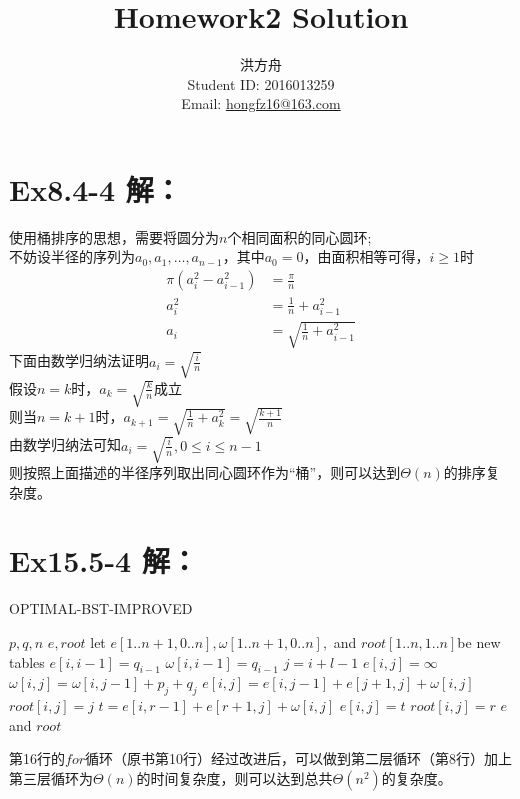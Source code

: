 \documentclass[12pt]{article}
\title{Homework2 Solution}
\author{洪方舟\\Student ID: 2016013259\\Email: \href{mailto:hongfz16@163.com}{hongfz16@163.com}}
\begin{document}
  \maketitle
  \section*{Ex8.4-4 \textbf{解：}}
  	使用桶排序的思想，需要将圆分为$n$个相同面积的同心圆环;\\
  	不妨设半径的序列为$a_0,a_1,\ldots,a_{n-1}$，其中$a_0=0$，由面积相等可得，$i\geq1$时
  	\begin{align*}
  	  \pi(a_i^2-a_{i-1}^2) &= \frac{\pi}{n}\\
  	  a_i^2 &= \frac{1}{n}+a_{i-1}^2\\
  	  a_i &= \sqrt{\frac{1}{n}+a_{i-1}^2}
  	\end{align*}
  	下面由数学归纳法证明$a_i=\sqrt{\frac{i}{n}}$\\
  	假设$n=k$时，$a_k=\sqrt{\frac{k}{n}}$成立\\
  	则当$n=k+1$时，$a_{k+1}=\sqrt{\frac{1}{n}+a_k^2}=\sqrt{\frac{k+1}{n}}$\\
  	由数学归纳法可知$a_i=\sqrt{\frac{i}{n}},0\leq i \leq n-1$\\
  	则按照上面描述的半径序列取出同心圆环作为“桶”，则可以达到$\Theta(n)$的排序复杂度。
  \section*{Ex15.5-4 \textbf{解：}}
    \begin{algorithm}
        \caption{OPTIMAL-BST-IMPROVED}
        \begin{algorithmic}[1]
            \Require $p,q,n$
            \Ensure $e,root$
                \State let $e[1..n+1,0..n],\omega[1..n+1,0..n],$ and $root[1..n,1..n]$be new tables
                	\State$e[i,i-1]=q_{i-1}$
                	\State$\omega[i,i-1]=q_{i-1}$
                \EndFor
               			\State$j=i+l-1$
               			\State$e[i,j]=\infty$
               			\State$\omega[i,j]=\omega[i,j-1]+p_j+q_j$
               				\State $e[i,j]=e[i,j-1]+e[j+1,j]+\omega[i,j]$
               				\State $root[i,j]=j$
               			\Else
               					\State $t=e[i,r-1]+e[r+1,j]+\omega[i,j]$
               						\State $e[i,j]=t$
               						\State $root[i,j]=r$
               					\EndIf
               				\EndFor
               			\EndIf
               		\EndFor
               	\EndFor
               	\State \Return $e$ and $root$
            \EndFunction
        \end{algorithmic}
    \end{algorithm}
    第16行的$for$循环（原书第10行）经过改进后，可以做到第二层循环（第8行）加上第三层循环为$\Theta(n)$的时间复杂度，则可以达到总共$\Theta(n^2)$的复杂度。
\end{document}
